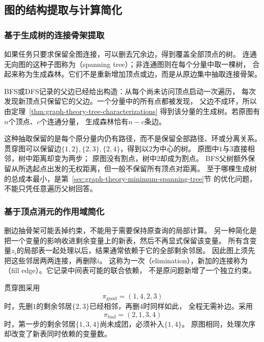 \subsection{图的结构提取与计算简化}

\subsubsection{基于生成树的连接骨架提取}
\label{sec:graph-theory-spanning-skeleton}

如果任务只要求保留全图连接，可以删去冗余边，得到覆盖全部顶点的树。
连通无向图的这种子图称为（spanning tree）；非连通图则在每个分量中取一棵树，
合起来称为生成森林。它们不是重新增加顶点或边，而是从原边集中抽取连接骨架。

BFS或DFS记录的父边已经给出构造：从每个尚未访问顶点启动一次遍历，
每次发现新顶点只保留它的父边。一个分量中的所有点都被发现，
父边不成环，所以由定理~\ref{thm:graph-theory-tree-characterizations}
得到该分量的生成树。若原图有\(n\)个顶点、\(c\)个连通分量，
生成森林恰有\(n-c\)条边。

这种抽取保留的是每个原分量内仍有路径，而不是保留全部路径、环或分离关系。
贯穿图可以保留边\(\{1,2\},\{2,3\},\{2,4\}\)，得到以\(2\)为中心的树。
原图中\(1\)与\(3\)直接相邻，树中距离却变为两步；
原图没有割点，树中\(2\)却成为割点。
BFS父树额外保留从所选起点出发的无权距离，但一般不保留所有顶点对距离。
至于哪棵生成树的总成本最小，是第~\ref{sec:graph-theory-minimum-spanning-tree}节
的优化问题，不能只凭任意遍历父树回答。

\subsubsection{基于顶点消元的作用域简化}
\label{sec:graph-theory-elimination-width}

删边抽骨架可能丢掉约束，不能用于需要保持原查询的局部计算。
另一种简化是把一个变量的影响收进剩余变量上的新表，然后不再显式保留该变量。
所有含变量\(z_i\)的局部表一起处理以后，结果通常依赖于它的全部剩余邻居。
因此图上须先把这些邻居两两连接，再删除\(i\)。
这称为一次（elimination），新加的连接称为
（fill edge）。它记录中间表可能的联合依赖，
不是原问题新增了一个独立约束。

贯穿图采用
\[
  \pi_{\mathrm{good}}=(1,4,2,3)
\]
时，先删\(1\)的剩余邻居\(\{2,3\}\)已经相邻，再删\(4\)时同样如此，
全程无需补边。采用
\[
  \pi_{\mathrm{bad}}=(2,1,3,4)
\]
时，第一步的剩余邻居\(\{1,3,4\}\)尚未成团，必须补入\(\{1,4\}\)。
原图相同，处理次序却改变了新表同时依赖的变量数。

